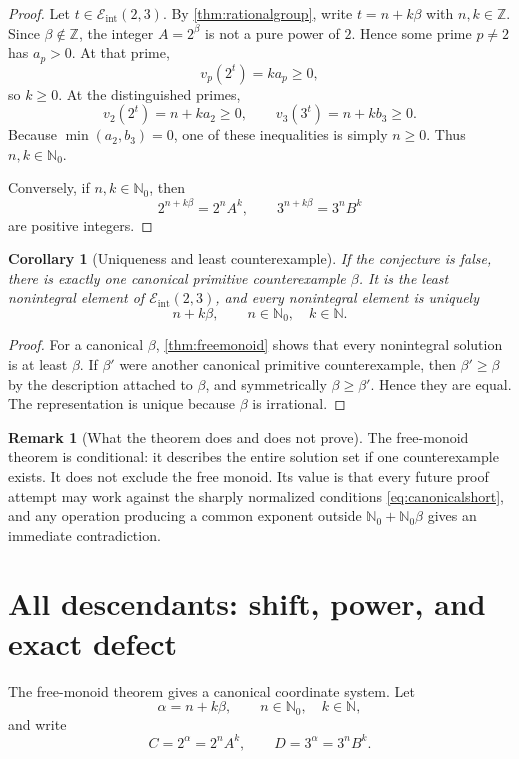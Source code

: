 \documentclass[11pt]{article}
\numberwithin{equation}{section}
\newtheorem{corollary}[theorem]{Corollary}
\theoremstyle{definition}
\newtheorem{remark}[theorem]{Remark}
\newcommand{\Z}{\mathbb{Z}}
\newcommand{\N}{\mathbb{N}}
\newcommand{\Eint}{\mathcal E_{\mathrm{int}}}
\begin{document}
\begin{proof}
Let \(t\in\Eint(2,3)\). By \cref{thm:rationalgroup}, write \(t=n+k\beta\) with \(n,k\in\Z\). Since \(\beta\notin\Z\), the integer \(A=2^\beta\) is not a pure power of \(2\). Hence some prime \(p\ne2\) has \(a_p>0\). At that prime,
\[
       v_p(2^t)=k a_p\ge0,
\]
so \(k\ge0\). At the distinguished primes,
\[
       v_2(2^t)=n+k a_2\ge0,
       \qquad
       v_3(3^t)=n+k b_3\ge0.
\]
Because \(\min(a_2,b_3)=0\), one of these inequalities is simply \(n\ge0\). Thus \(n,k\in\N_0\).

Conversely, if \(n,k\in\N_0\), then
\[
       2^{n+k\beta}=2^nA^k,
       \qquad
       3^{n+k\beta}=3^nB^k
\]
are positive integers.
\end{proof}

\begin{corollary}[Uniqueness and least counterexample]\label{cor:uniqueprimitive}
If the conjecture is false, there is exactly one canonical primitive counterexample \(\beta\). It is the least nonintegral element of \(\Eint(2,3)\), and every nonintegral element is uniquely
\[
       n+k\beta,\qquad n\in\N_0,\quad k\in\N.
\]
\end{corollary}

\begin{proof}
For a canonical \(\beta\), \cref{thm:freemonoid} shows that every nonintegral solution is at least \(\beta\). If \(\beta'\) were another canonical primitive counterexample, then \(\beta'\ge\beta\) by the description attached to \(\beta\), and symmetrically \(\beta\ge\beta'\). Hence they are equal. The representation is unique because \(\beta\) is irrational.
\end{proof}

\begin{remark}[What the theorem does and does not prove]
The free-monoid theorem is conditional: it describes the entire solution set if one counterexample exists. It does not exclude the free monoid. Its value is that every future proof attempt may work against the sharply normalized conditions \eqref{eq:canonicalshort}, and any operation producing a common exponent outside \(\N_0+\N_0\beta\) gives an immediate contradiction.
\end{remark}

\section{All descendants: shift, power, and exact defect}

The free-monoid theorem gives a canonical coordinate system. Let
\[
       \alpha=n+k\beta,
       \qquad n\in\N_0,\quad k\in\N,
\]
and write
\[
       C=2^\alpha=2^nA^k,
       \qquad
       D=3^\alpha=3^nB^k.
\]
\end{document}

